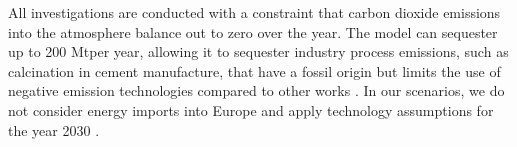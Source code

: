 All investigations are conducted with a constraint that carbon dioxide emissions
into the atmosphere balance out to zero over the year. The model can sequester
up to 200 Mt\co per year, allowing it to sequester industry process emissions,
such as calcination in cement manufacture, that have a fossil origin but limits
the use of negative emission technologies compared to other works
\cite{blancoPotentialHydrogen2018}. In our scenarios, we do not
consider energy imports into Europe and apply technology assumptions for
the year 2030 \cite{DEA}.



